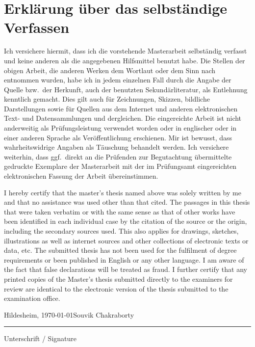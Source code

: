 
\chapter*{Erkl\"arung \"uber das selbst\"andige Verfassen}

\vspace{1cm}

\noindent
Ich versichere hiermit, dass ich die vorstehende Masterarbeit
selbst\"andig verfasst und keine anderen als die angegebenen
Hilfsmittel benutzt habe. Die Stellen der obigen Arbeit, die
anderen Werken dem Wortlaut oder dem Sinn nach entnommen wurden,
habe ich in jedem einzelnen Fall durch die Angabe der Quelle bzw.\
der Herkunft, auch der benutzten Sekund\"arliteratur, als
Entlehnung kenntlich gemacht. Dies gilt auch f\"ur Zeichnungen,
Skizzen, bildliche Darstellungen sowie f\"ur Quellen aus dem
Internet und anderen elektronischen Text- und Datensammlungen und
dergleichen. Die eingereichte Arbeit ist nicht anderweitig als
Pr\"ufungsleistung verwendet worden oder in englischer oder in
einer anderen Sprache als Ver\"offentlichung erschienen. Mir ist
bewusst, dass wahrheitswidrige Angaben als T\"auschung behandelt
werden. Ich versichere weiterhin, dass ggf.\ direkt an die
Pr\"ufenden zur Begutachtung \"ubermittelte gedruckte Exemplare der
Masterarbeit mit der im Pr\"ufungsamt eingereichten elektronischen
Fassung der Arbeit \"ubereinstimmen.

\vspace{1.5cm}

\noindent
I hereby certify that the master's thesis named above was solely
written by me and that no assistance was used other than that
cited. The passages in this thesis that were taken verbatim or
with the same sense as that of other works have been identified in
each individual case by the citation of the source or the origin,
including the secondary sources used. This also applies for
drawings, sketches, illustrations as well as internet sources and
other collections of electronic texts or data, etc. The submitted
thesis has not been used for the fulfilment of degree requirements
or been published in English or any other language. I am aware of
the fact that false declarations will be treated as fraud. I
further certify that any printed copies of the Master's thesis
submitted directly to the examiners for review are identical to
the electronic version of the thesis submitted to the examination
office.

\vspace{3cm}

\noindent
Hildesheim, \today \hfill Souvik Chakraborty

\vspace{1.5cm}

\noindent
\rule{6cm}{0.4pt}

\noindent
Unterschrift / Signature
